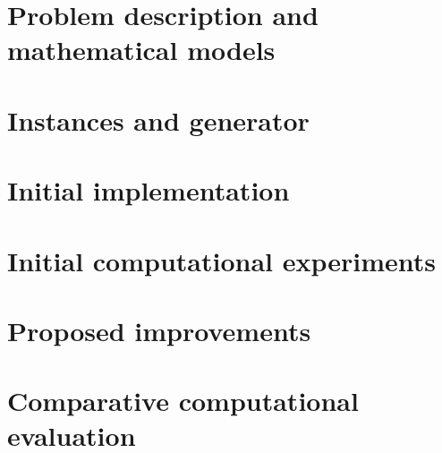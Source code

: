 \documentclass[11pt,a4paper]{article}
\theoremstyle{remark}
\begin{document}
\tableofcontents
\newpage

\section{Problem description and mathematical models}
\label{sec:model}



\section{Instances and generator}
\label{sec:instances}


\section{Initial implementation}
\label{sec:implementation}


\section{Initial computational experiments}
\label{sec:baseline-exp}


\section{Proposed improvements}
\label{sec:improvements}


\section{Comparative computational evaluation}
\label{sec:comparison}




\end{document}
